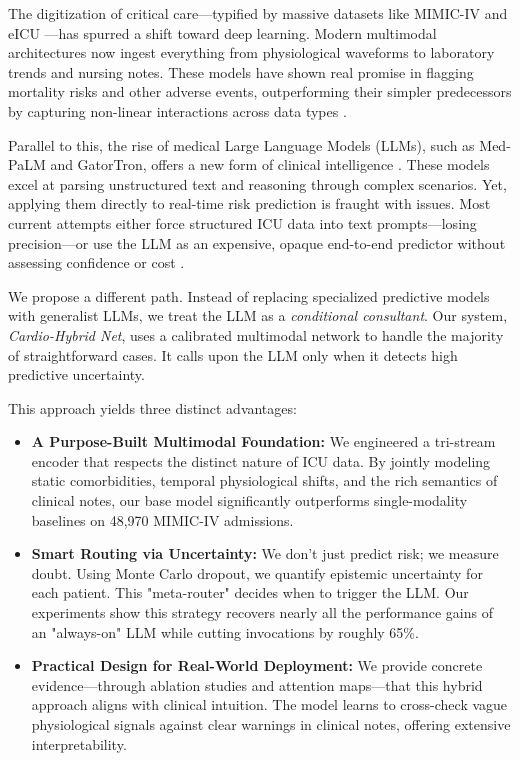 \documentclass{article}
\begin{document}
The digitization of critical care---typified by massive datasets like MIMIC-IV and eICU \cite{Johnson2023MIMICIV,Pollard2018eICU}---has spurred a shift toward deep learning. Modern multimodal architectures now ingest everything from physiological waveforms to laboratory trends and nursing notes. These models have shown real promise in flagging mortality risks and other adverse events, outperforming their simpler predecessors by capturing non-linear interactions across data types \cite{OzrazgatBaslanti2021AIICU,Khadanga2019ICUNotes,Shukla2020IntegratingTSNotes,Deznabi2021MortalityNotes}.

Parallel to this, the rise of medical Large Language Models (LLMs), such as Med-PaLM and GatorTron, offers a new form of clinical intelligence \cite{Singhal2023MedPaLM,Yang2022GatorTron}. These models excel at parsing unstructured text and reasoning through complex scenarios. Yet, applying them directly to real-time risk prediction is fraught with issues. Most current attempts either force structured ICU data into text prompts---losing precision---or use the LLM as an expensive, opaque end-to-end predictor without assessing confidence or cost \cite{Griot2025LLMImplementationEHR}.

We propose a different path. Instead of replacing specialized predictive models with generalist LLMs, we treat the LLM as a \emph{conditional consultant}. Our system, \emph{Cardio-Hybrid Net}, uses a calibrated multimodal network to handle the majority of straightforward cases. It calls upon the LLM only when it detects high predictive uncertainty.

This approach yields three distinct advantages:
\begin{itemize}
  \item \textbf{A Purpose-Built Multimodal Foundation:} We engineered a tri-stream encoder that respects the distinct nature of ICU data. By jointly modeling static comorbidities, temporal physiological shifts, and the rich semantics of clinical notes, our base model significantly outperforms single-modality baselines on 48,970 MIMIC-IV admissions.

  \item \textbf{Smart Routing via Uncertainty:} We don't just predict risk; we measure doubt. Using Monte Carlo dropout, we quantify epistemic uncertainty for each patient. This "meta-router" decides when to trigger the LLM. Our experiments show this strategy recovers nearly all the performance gains of an "always-on" LLM while cutting invocations by roughly 65\%.

  \item \textbf{Practical Design for Real-World Deployment:} We provide concrete evidence—through ablation studies and attention maps—that this hybrid approach aligns with clinical intuition. The model learns to cross-check vague physiological signals against clear warnings in clinical notes, offering extensive interpretability.
\end{itemize}
\end{document}
